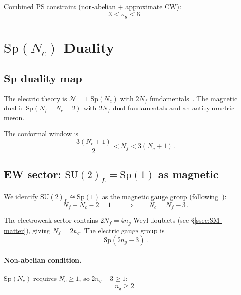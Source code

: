 \documentclass[11pt,a4paper]{article}
\theoremstyle{plain}
\theoremstyle{definition}
\theoremstyle{remark}
\newcommand{\Nc}{N_{\!c}}
\newcommand{\Nf}{N_{\!f}}
\newcommand{\ngen}{n_g}
\newcommand{\SU}[1]{\mathrm{SU}(#1)}
\newcommand{\Sp}[1]{\mathrm{Sp}(#1)}
\begin{document}
Combined PS constraint (non-abelian + approximate CW):
\begin{equation}\label{eq:PS-combined}
  3 \leq \ngen \leq 6\,.
\end{equation}


\section{$\Sp{\Nc}$ Duality}
\label{sec:Sp-duality}

\subsection{Sp duality map}

The electric theory is $\mathcal{N}=1$ $\Sp{\Nc}$ with $2\Nf$
fundamentals~\cite{IS9506101}.  The magnetic dual is $\Sp{\Nf - \Nc - 2}$
with $2\Nf$ dual fundamentals and an antisymmetric meson.

The conformal window is
\begin{equation}\label{eq:Sp-CW}
  \frac{3(\Nc + 1)}{2} < \Nf < 3(\Nc + 1)\,.
\end{equation}

\subsection{EW sector: $\SU{2}_L = \Sp{1}$ as magnetic}

We identify $\SU{2}_L \cong \Sp{1}$ as the magnetic gauge group
(following~\cite{Paper1}):
\begin{equation}\label{eq:Sp-constraint}
  \Nf - \Nc - 2 = 1
  \qquad\Longrightarrow\qquad
  \Nc = \Nf - 3\,.
\end{equation}

The electroweak sector contains $2\Nf = 4\ngen$ Weyl doublets (see
\S\ref{ssec:SM-matter}), giving $\Nf = 2\ngen$.
The electric gauge group is
\begin{equation}\label{eq:Sp-electric}
  \boxed{\Sp{2\ngen - 3}}\,.
\end{equation}

\paragraph{Non-abelian condition.}
$\Sp{\Nc}$ requires $\Nc \geq 1$, so $2\ngen - 3 \geq 1$:
\begin{equation}\label{eq:Sp-bound}
  \boxed{\ngen \geq 2}\,.
\end{equation}
\end{document}
